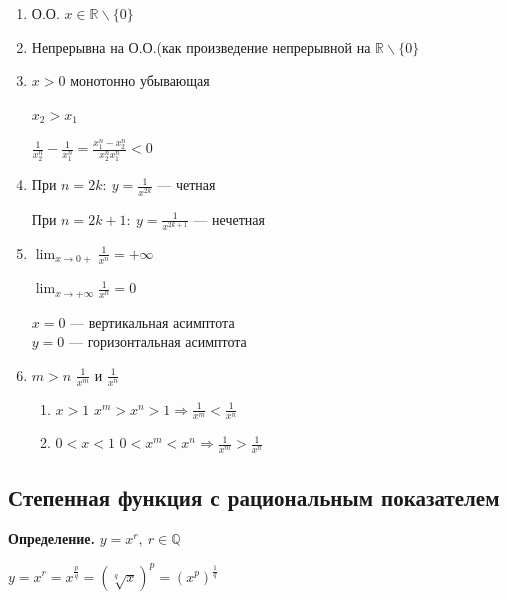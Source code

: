 \documentclass{article}
\begin{document}
    \begin{enumerate}
        \item О.О. \( x \in \mathbb{R} \backslash \{0\} \)
        \item Непрерывна на О.О.(как произведение непрерывной на \(\mathbb{R} \backslash \{0\} \)
        \item \( x > 0 \) монотонно убывающая
        
        \( x_2 > x_1 \)

        \( \frac{1}{x_2^n} - \frac{1}{x_1^n} = \frac{x_1^n - x_2^n}{x_2^n x_1^n} < 0 \)
        \item При \( n = 2k:\ y = \frac{1}{x^{2k}} \) --- четная
        
        При \( n = 2k + 1:\ y = \frac{1}{x^{2k + 1}} \) --- нечетная
        
        \item \(\lim_{x \rightarrow 0+} \frac{1}{x^n} = +\infty\)

            \(\lim_{x \rightarrow +\infty} \frac{1}{x^n} = 0\)

            \(x = 0\) --- вертикальная асимптота\\
            \(y = 0\) --- горизонтальная асимптота
        \item \(m > n\) \(\frac{1}{x^m}\) и \(\frac{1}{x^n}\)
            \begin{enumerate}
                \item \(x > 1\) \(x^m > x^n > 1 \Rightarrow \frac{1}{x^m} < \frac{1}{x^n}\)
                \item \(0 < x < 1\) \(0 < x^m < x^n \Rightarrow \frac{1}{x^m} > \frac{1}{x^n}\)
            \end{enumerate}
    \end{enumerate}

    \subsection{Степенная функция с рациональным показателем}

    \textbf{Определение.} \( y = x^r,\ r \in \mathbb{Q} \)

    \( y = x^r = x^{\frac{p}{q}} = (\sqrt[q]{x})^p = (x^p)^{\frac{1}{q}} \)
\end{document}
